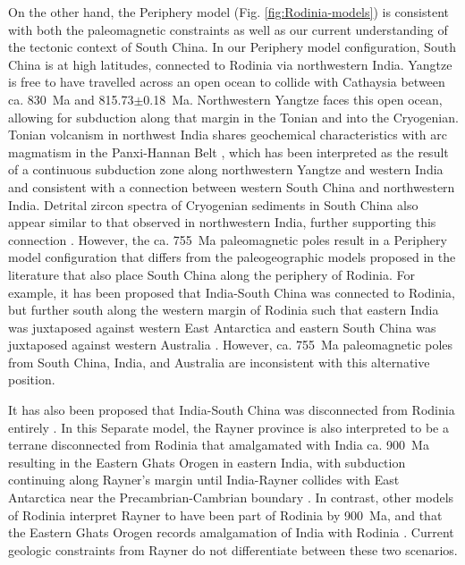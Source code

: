 On the other hand, the Periphery model (Fig. \ref{fig:Rodinia-models}) is consistent with both the paleomagnetic constraints as well as our current understanding of the tectonic context of South China. In our Periphery model configuration, South China is at high latitudes, connected to Rodinia via northwestern India. Yangtze is free to have travelled across an open ocean to collide with Cathaysia between ca. 830~Ma and 815.73$\pm$0.18~Ma. Northwestern Yangtze faces this open ocean, allowing for subduction along that margin in the Tonian and into the Cryogenian. Tonian volcanism in northwest India shares geochemical characteristics with arc magmatism in the Panxi-Hannan Belt \citep{Ashwal2013a, Cawood2017a}, which has been interpreted as the result of a continuous subduction zone along northwestern Yangtze and western India and consistent with a connection between western South China and northwestern India. Detrital zircon spectra of Cryogenian sediments in South China also appear similar to that observed in northwestern India, further supporting this connection \citep{Cawood2017a, Qi2020a}. However, the ca. 755~Ma paleomagnetic poles result in a Periphery model configuration that differs from the paleogeographic models proposed in the literature that also place South China along the periphery of Rodinia. For example, it has been proposed that India-South China was connected to Rodinia, but further south along the western margin of Rodinia such that eastern India was juxtaposed against western East Antarctica and eastern South China was juxtaposed against western Australia \citep{Cawood2017a}. However, ca. 755~Ma paleomagnetic poles from South China, India, and Australia are inconsistent with this alternative position.

It has also been proposed that India-South China was disconnected from Rodinia entirely \citep{Merdith2017a}. In this Separate model, the Rayner province is also interpreted to be a terrane disconnected from Rodinia that amalgamated with India ca. 900~Ma resulting in the Eastern Ghats Orogen in eastern India, with subduction continuing along Rayner's margin until India-Rayner collides with East Antarctica near the Precambrian-Cambrian boundary \citep{Merdith2017a}. In contrast, other models of Rodinia interpret Rayner to have been part of Rodinia by 900~Ma, and that the Eastern Ghats Orogen records amalgamation of India with Rodinia \citep{Li2008a}. Current geologic constraints from Rayner do not differentiate between these two scenarios.


